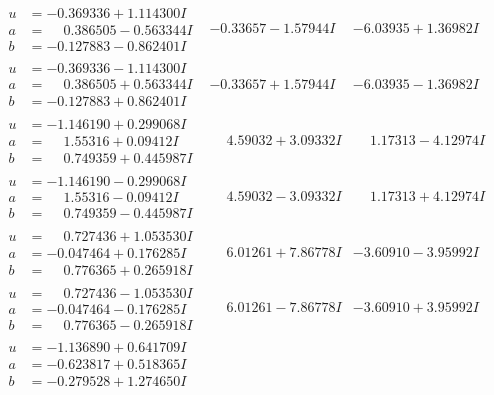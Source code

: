\documentclass[1p]{elsarticle_modified}
\theoremstyle{definition}
\begin{document}
$$\begin{array}{c|c|c}
\begin{aligned}
u &= -0.369336 + 1.114300 I \\
a &= \phantom{-}0.386505 - 0.563344 I \\
b &= -0.127883 - 0.862401 I\end{aligned}
 & -0.33657 - 1.57944 I & -6.03935 + 1.36982 I \\ \hline\begin{aligned}
u &= -0.369336 - 1.114300 I \\
a &= \phantom{-}0.386505 + 0.563344 I \\
b &= -0.127883 + 0.862401 I\end{aligned}
 & -0.33657 + 1.57944 I & -6.03935 - 1.36982 I \\ \hline\begin{aligned}
u &= -1.146190 + 0.299068 I \\
a &= \phantom{-}1.55316 + 0.09412 I \\
b &= \phantom{-}0.749359 + 0.445987 I\end{aligned}
 & \phantom{-}4.59032 + 3.09332 I & \phantom{-}1.17313 - 4.12974 I \\ \hline\begin{aligned}
u &= -1.146190 - 0.299068 I \\
a &= \phantom{-}1.55316 - 0.09412 I \\
b &= \phantom{-}0.749359 - 0.445987 I\end{aligned}
 & \phantom{-}4.59032 - 3.09332 I & \phantom{-}1.17313 + 4.12974 I \\ \hline\begin{aligned}
u &= \phantom{-}0.727436 + 1.053530 I \\
a &= -0.047464 + 0.176285 I \\
b &= \phantom{-}0.776365 + 0.265918 I\end{aligned}
 & \phantom{-}6.01261 + 7.86778 I & -3.60910 - 3.95992 I \\ \hline\begin{aligned}
u &= \phantom{-}0.727436 - 1.053530 I \\
a &= -0.047464 - 0.176285 I \\
b &= \phantom{-}0.776365 - 0.265918 I\end{aligned}
 & \phantom{-}6.01261 - 7.86778 I & -3.60910 + 3.95992 I \\ \hline\begin{aligned}
u &= -1.136890 + 0.641709 I \\
a &= -0.623817 + 0.518365 I \\
b &= -0.279528 + 1.274650 I\end{aligned}

\end{array}$$
\end{document}

